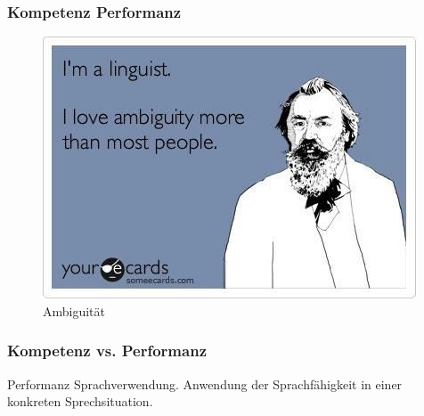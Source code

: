 \begin{frame}
\frametitle{Kompetenz \vs Performanz}

\begin{figure}
\centering
	\includegraphics[scale=.5]{material/08ambiguity}
	\caption{Ambiguität}
\end{figure}

\end{frame}


\begin{frame}
\frametitle{Kompetenz vs. Performanz}

\begin{block}{Performanz}
Sprachverwendung. Anwendung der Sprachfähigkeit in einer konkreten Sprechsituation.
\end{block}

\end{frame}


